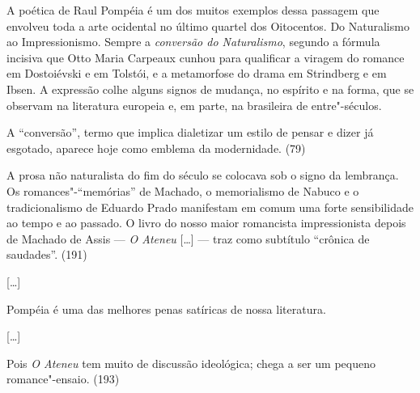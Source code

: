 
A poética de Raul Pompéia é um dos muitos exemplos dessa
passagem que envolveu toda a arte ocidental no último quartel dos
Oitocentos. Do Naturalismo ao Impressionismo. Sempre a
\textit{conversão do Naturalismo}, segundo a
fórmula incisiva que Otto Maria Carpeaux cunhou para qualificar a
viragem do romance em Dostoiévski e em Tolstói, e a metamorfose do
drama em Strindberg e em Ibsen. A expressão colhe alguns signos de
mudança, no espírito e na forma, que se observam na literatura europeia
e, em parte, na brasileira de entre"-séculos.

A ``conversão'', termo que implica dialetizar um estilo de pensar e dizer
já esgotado, aparece hoje como emblema da modernidade. (79)



A prosa não naturalista do fim do século se colocava
sob o signo da lembrança. Os romances"-``memórias'' de Machado, o
memorialismo de Nabuco e o tradicionalismo de Eduardo Prado manifestam
em comum uma forte sensibilidade ao tempo e ao passado. O livro do
nosso maior romancista impressionista depois de Machado de Assis --- 
\textit{O Ateneu} [\ldots] --- traz como subtítulo ``crônica de saudades''. (191)

[\ldots]

Pompéia é uma das melhores penas satíricas de nossa literatura.

[\ldots]

Pois \textit{O Ateneu} tem muito de discussão ideológica; 
chega a ser um pequeno romance"-ensaio.
(193) 



